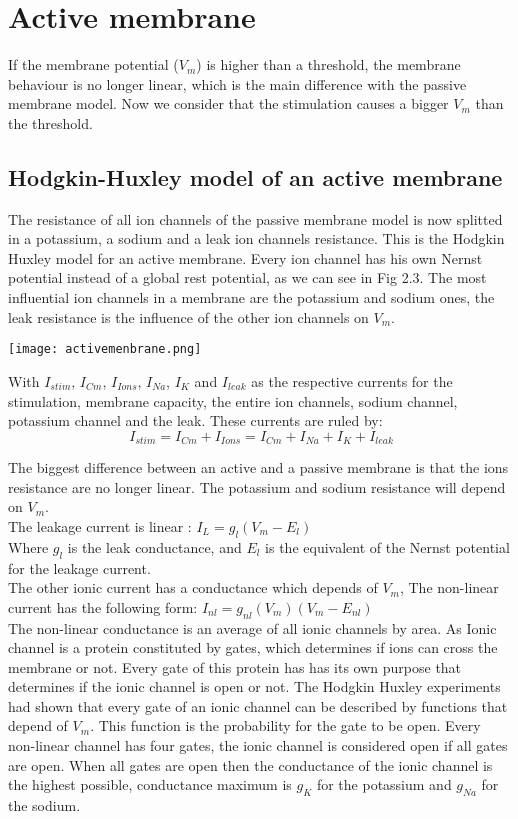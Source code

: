 \documentclass[a4paper,11pt]{report}
\begin{document}
\section{Active membrane}  
If the membrane potential ($V_{m}$)	 is higher than a threshold, the membrane behaviour is no longer linear, which is the main difference with the passive membrane model. Now we consider that the stimulation causes a bigger $V_{m}$ than the threshold. 
\subsection{Hodgkin-Huxley model of an active membrane}
The resistance of all ion channels of the passive membrane model is now splitted in a potassium, a sodium and a leak ion channels resistance. This is the Hodgkin Huxley model for an active membrane.
Every ion channel has his own Nernst potential instead of a global rest potential, as we can see in Fig 2.3. The most influential ion channels in a membrane are the potassium and sodium ones, the leak resistance is the influence of the other ion channels on $V_{m}$.


\begin{minipage}{0.55\linewidth}
\texttt{[image: activemenbrane.png]} 
\label{fig1}
\end{minipage}\hfill
\begin{minipage}{0.4\linewidth}
With $I_{stim}$, $I_{Cm}$, $I_{Ions}$, $I_{Na}$, $I_{K}$ and $I_{leak}$ as the respective currents for the stimulation, membrane capacity, the entire ion channels, sodium channel,  potassium
channel and the leak. These currents are ruled by: 
$$
\ I_{stim} = I_{Cm}+I_{Ions}=I_{Cm}+I_{Na}+I_{K}+I_{leak} 
$$
\end{minipage} 
 
The biggest difference between an active and a passive membrane is that the ions resistance are no longer linear. The potassium and sodium resistance will depend on $V_{m}$.\\
The leakage current is linear : $I_{L}= g_{l}(V_{m}-E_{l})$\\
Where $g_{l}$ is the leak conductance, and $E_{l}$ is the equivalent of the Nernst potential for the leakage current.\\
The other ionic current has a conductance which depends of $V_{m}$, The non-linear current has the following form: $I_{nl}=g_{nl}(V_{m})(V_{m}-E_{nl})$\\
The non-linear conductance is an average of all ionic channels by area. As Ionic channel is a protein constituted by gates, which determines if ions can cross the membrane or not. Every gate of this protein has has its own purpose that determines if the ionic channel is open or not. The Hodgkin Huxley experiments had shown that every gate of an ionic channel can be described by functions that depend of $V_{m}$. This function is the probability for the gate to be open. Every non-linear channel has four gates, the ionic channel is considered open if all gates are open. When all gates are open then the conductance of the ionic channel is the highest possible, conductance maximum is $g_{K}$ for the potassium and  $g_{Na}$ for the sodium. 
\end{document}
